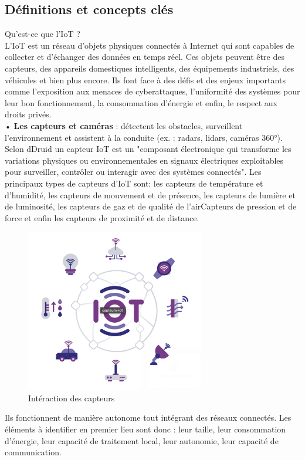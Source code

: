 \subsection{Définitions et concepts clés}
Qu'est-ce que l'IoT ?\\
L'IoT est un réseau d’objets physiques connectés à Internet qui sont capables de collecter et d’échanger des données en temps réel. Ces objets peuvent être des capteurs, des appareils domestiques intelligents, des équipements industriels, des véhicules et bien plus encore. Ils font face à des défis et des enjeux importants comme l'exposition aux menaces de cyberattaques, l'uniformité des systèmes pour leur bon fonctionnement, la consommation d'énergie et enfin, le respect aux droits privés. \\
• \textbf{Les capteurs et caméras} : détectent les obstacles, surveillent l’environnement et assistent à la conduite (ex. : radars, lidars, caméras 360°). Selon dDruid\cite{capteur} un capteur IoT est un "composant électronique qui transforme les variations physiques ou environnementales en signaux électriques exploitables pour surveiller, contrôler ou interagir avec des systèmes connectés".
Les principaux types de capteurs d'IoT sont: les capteurs de température et d'humidité, les capteurs de mouvement et de présence, les capteurs de lumière et de luminosité, les capteurs de gaz et de qualité de l’airCapteurs de pression et de force et enfin les capteurs de proximité et de distance.
\begin{figure}[H]
    \centering
    \includegraphics[width=0.7\textwidth]{images/capteur.png} 
    \caption{Intéraction des capteurs}
\end{figure}
Ils fonctionnent de manière autonome tout intégrant des réseaux connectés. Les éléments à identifier en premier lieu sont donc : leur taille, leur consommation d’énergie, leur capacité de traitement local, leur autonomie, leur capacité de communication.\\
